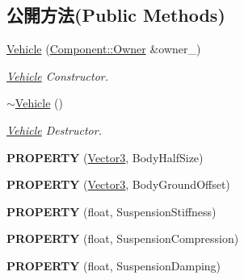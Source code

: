 \subsection*{公開方法(Public Methods)}
\begin{DoxyCompactItemize}
\item 
\hyperlink{class_i_dream_sky_1_1_physics3_1_1_vehicle_aed5772094a627803651a146605d4ab95}{Vehicle} (\hyperlink{class_i_dream_sky_1_1_component_1_1_owner}{Component\+::\+Owner} \&owner\+\_\+)
\begin{DoxyCompactList}\small\item\em \hyperlink{class_i_dream_sky_1_1_physics3_1_1_vehicle}{Vehicle} Constructor. \end{DoxyCompactList}\item 
\hyperlink{class_i_dream_sky_1_1_physics3_1_1_vehicle_ace18046e6684c09adc527e9836ebfbbf}{$\sim$\+Vehicle} ()
\begin{DoxyCompactList}\small\item\em \hyperlink{class_i_dream_sky_1_1_physics3_1_1_vehicle}{Vehicle} Destructor. \end{DoxyCompactList}\item 
{\bfseries P\+R\+O\+P\+E\+R\+TY} (\hyperlink{class_i_dream_sky_1_1_vector3}{Vector3}, Body\+Half\+Size)\hypertarget{class_i_dream_sky_1_1_physics3_1_1_vehicle_aa024de5d80b0332ad4f7b665b2c0652d}{}\label{class_i_dream_sky_1_1_physics3_1_1_vehicle_aa024de5d80b0332ad4f7b665b2c0652d}

\item 
{\bfseries P\+R\+O\+P\+E\+R\+TY} (\hyperlink{class_i_dream_sky_1_1_vector3}{Vector3}, Body\+Ground\+Offset)\hypertarget{class_i_dream_sky_1_1_physics3_1_1_vehicle_a437647d09434b0876b1a0d600b2a144c}{}\label{class_i_dream_sky_1_1_physics3_1_1_vehicle_a437647d09434b0876b1a0d600b2a144c}

\item 
{\bfseries P\+R\+O\+P\+E\+R\+TY} (float, Suspension\+Stiffness)\hypertarget{class_i_dream_sky_1_1_physics3_1_1_vehicle_ac77476cc8998aaf237ec1ff445f20cf1}{}\label{class_i_dream_sky_1_1_physics3_1_1_vehicle_ac77476cc8998aaf237ec1ff445f20cf1}

\item 
{\bfseries P\+R\+O\+P\+E\+R\+TY} (float, Suspension\+Compression)\hypertarget{class_i_dream_sky_1_1_physics3_1_1_vehicle_a375f5a32c50ea3ff37708146ccf3c80f}{}\label{class_i_dream_sky_1_1_physics3_1_1_vehicle_a375f5a32c50ea3ff37708146ccf3c80f}

\item 
{\bfseries P\+R\+O\+P\+E\+R\+TY} (float, Suspension\+Damping)\hypertarget{class_i_dream_sky_1_1_physics3_1_1_vehicle_aeeba940982a0fafceecd081be0adcb24}{}\label{class_i_dream_sky_1_1_physics3_1_1_vehicle_aeeba940982a0fafceecd081be0adcb24}


\end{DoxyCompactItemize}
